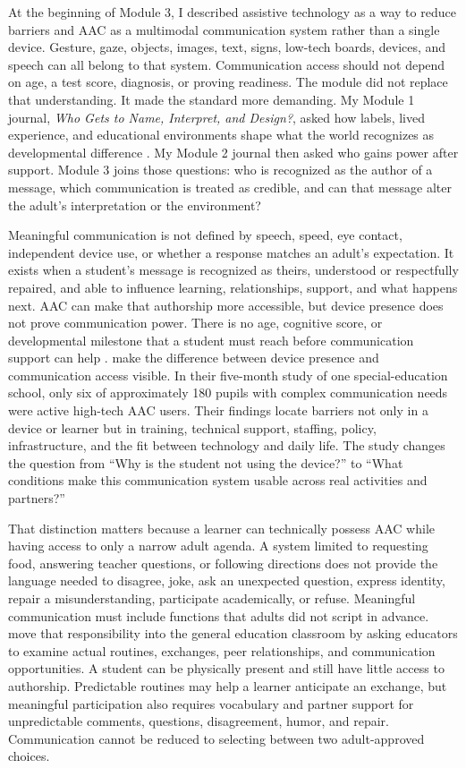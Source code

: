 
At the beginning of Module 3, I described assistive technology as a way to reduce barriers and AAC as a multimodal communication system rather than a single device. Gesture, gaze, objects, images, text, signs, low-tech boards, devices, and speech can all belong to that system. Communication access should not depend on age, a test score, diagnosis, or proving readiness. The module did not replace that understanding. It made the standard more demanding. My Module 1 journal, \textit{Who Gets to Name, Interpret, and Design?}, asked how labels, lived experience, and educational environments shape what the world recognizes as developmental difference \citep{garciabautista2026module1journal}. My Module 2 journal then asked who gains power after support. Module 3 joins those questions: who is recognized as the author of a message, which communication is treated as credible, and can that message alter the adult's interpretation or the environment?

Meaningful communication is not defined by speech, speed, eye contact, independent device use, or whether a response matches an adult's expectation. It exists when a student's message is recognized as theirs, understood or respectfully repaired, and able to influence learning, relationships, support, and what happens next. AAC can make that authorship more accessible, but device presence does not prove communication power. There is no age, cognitive score, or developmental milestone that a student must reach before communication support can help \citep{ashaAAC}. \citet{norrie2021context} make the difference between device presence and communication access visible. In their five-month study of one special-education school, only six of approximately 180 pupils with complex communication needs were active high-tech AAC users. Their findings locate barriers not only in a device or learner but in training, technical support, staffing, policy, infrastructure, and the fit between technology and daily life. The study changes the question from ``Why is the student not using the device?'' to ``What conditions make this communication system usable across real activities and partners?''

That distinction matters because a learner can technically possess AAC while having access to only a narrow adult agenda. A system limited to requesting food, answering teacher questions, or following directions does not provide the language needed to disagree, joke, ask an unexpected question, express identity, repair a misunderstanding, participate academically, or refuse. Meaningful communication must include functions that adults did not script in advance. \citet{downing2015classroom} move that responsibility into the general education classroom by asking educators to examine actual routines, exchanges, peer relationships, and communication opportunities. A student can be physically present and still have little access to authorship. Predictable routines may help a learner anticipate an exchange, but meaningful participation also requires vocabulary and partner support for unpredictable comments, questions, disagreement, humor, and repair. Communication cannot be reduced to selecting between two adult-approved choices.
